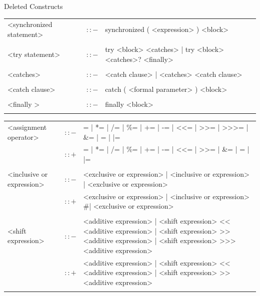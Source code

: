 \documentclass[landscape, 11pt]{article}
\begin{document}
\begin{qsection}{Deleted Constructs}
\begin{enumerate}[label=\bt{\theenumi.}]
\begin{longtable}{R{7cm} c L{15cm}}
				<synchronized statement>					&	$\colon\colon-$	&	synchronized ( <expression> ) <block> \\\\
				<try statement>								&	$\colon\colon-$	&	try <block> <catches> | try <block> <catches>? <finally> \\\\
				<catches>									&	$\colon\colon-$	&	<catch clause> | <catches> <catch clause> \\\\
				<catch clause>								&	$\colon\colon-$	&	catch ( <formal parameter> ) <block> \\\\
				<finally >									&	$\colon\colon-$	&	finally <block> \\\\
			\end{longtable}

		\ditem[Expressions.]
			\begin{longtable}{R{7cm} c L{15cm}}
				<assignment operator>						&	$\colon\colon-$	&	= | *= | /= | \%= | += | -= | <<= | >>= | >>>= | \&= | \wedge= | |= \\
															&	$\colon\colon+$	&	= | *= | /= | \%= | += | -= | <<= | >>= | \&= | \wedge= | |= \\\\
				<inclusive or expression>					&	$\colon\colon-$	&	<exclusive or expression> | <inclusive or expression> | <exclusive or expression> \\
															&	$\colon\colon+$	&	<exclusive or expression> | <inclusive or expression> #| <exclusive or expression> \\\\
				<shift expression>							&	$\colon\colon-$	&	<additive expression> | <shift expression> << <additive expression> | <shift expression> >> <additive expression> | <shift expression> >>> <additive expression> \\
															&	$\colon\colon+$	&	<additive expression> | <shift expression> << <additive expression> | <shift expression> >> <additive expression> \\\\
			\end{longtable}


\end{enumerate}
\end{qsection}
\end{document}
